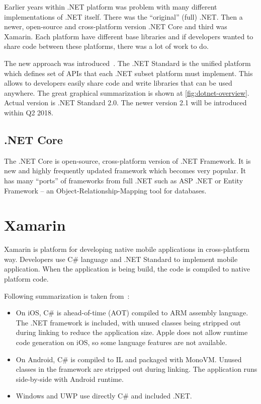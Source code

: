 Earlier years within .NET platform was problem with many different implementations of .NET itself. There was the ``original'' (full) .NET. Then a newer, open-source and cross-platform version .NET Core and third was Xamarin. Each platform have different base libraries and if developers wanted to share code between these platforms, there was a lot of work to do. 

The new approach was introduced~\cite{introducing-dotnet-standard}. The .NET Standard is the unified platform which defines set of APIs that each .NET subset platform must implement. This allows to developers easily share code and write libraries that can be used anywhere. The great graphical summarization is shown at \cref{fig:dotnet-overview}. Actual version is .NET Standard 2.0. The newer version 2.1 will be introduced within Q2 2018. 
\subsection{.NET Core}
The .NET Core is open-source, cross-platform version of .NET Framework. It is new and highly frequently updated framework which becomes very popular. It has many ``ports'' of frameworks from full .NET such as ASP .NET or Entity Framework -- an Object-Relationship-Mapping tool for databases. 
\section{Xamarin}
Xamarin is platform for developing native mobile applications in cross-platform way. Developers use C\# language and .NET Standard to implement mobile application. When the application is being build, the code is compiled to native platform code. 

Following summarization is taken from~\cite{xamarin-understand-platform}:
\begin{itemize}
\item On iOS, C\# is ahead-of-time (AOT) compiled to ARM assembly language. The .NET framework is included, with unused classes being stripped out during linking to reduce the application size. Apple does not allow runtime code generation on iOS, so some language features are not available.
\item On Android, C\# is compiled to IL and packaged with MonoVM. Unused classes in the framework are stripped out during linking. The application runs side-by-side with Android runtime.
\item Windows and UWP use directly C\# and included .NET. 
\end{itemize}

